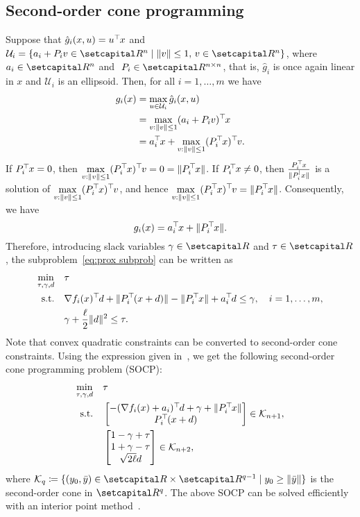 \documentclass[../../main]{subfiles}
\begin{document}
\subsection{Second-order cone programming} \label{sec:pgm:robust:SOCP}
Suppose that $\hat{g}_i (x,u) = u^\top\hspace{-1pt} x$ and ${\mathcal{U}}_i = \{ a_i + P_i v \in \setR^n \mid \| v \| \leq 1,\, v \in \setR^n \}$, where $a_i \in \setR^n$ and $\ P_i \in \setR^{n \times n}$, that is, $\hat{g}_i$ is once again linear in $x$ and $\mathcal{U}_i$ is an ellipsoid. Then, for all $i = 1,\dots,m$ we have
\begin{align}
g_i (x) &=  \max_{u \in {\mathcal{U}}_i } \hat{g}_i (x,u) \\
&=\max_{v : \| v \| \leq 1} (a_i + P_i v)^\top\hspace{-1pt} x \\
&= a_i^\top\hspace{-1pt} x + \max_{v : \| v \| \leq 1} (P_i^\top\hspace{-1pt} x)^\top\hspace{-1pt} v.
\end{align}
If $P_i^\top\hspace{-1pt} x = 0$, then $\displaystyle \max_{v : \| v \| \leq 1} (P_i^\top\hspace{-1pt} x)^\top\hspace{-1pt} v = 0 = \| P_i^\top\hspace{-1pt} x \|$. If $P_i^\top\hspace{-1pt} x \neq 0$, then $\frac{P_i^\top\hspace{-1pt} x}{\|P_i^| x\|}$ is a solution of $\displaystyle \max_{v : \| v \| \leq 1} (P_i^\top\hspace{-1pt} x)^\top\hspace{-1pt} v$, and hence $\displaystyle \max_{v : \| v \| \leq 1} (P_i^\top\hspace{-1pt} x)^\top\hspace{-1pt} v = \| P_i^\top\hspace{-1pt} x \|$. Consequently, we have
\[
	g_i(x) = a_i^\top\hspace{-1pt} x + \| P_i^\top\hspace{-1pt} x \|.
\]
Therefore, introducing slack variables $\gamma \in \setR$ and $\tau \in \setR$, the subproblem~\cref{eq:prox subprob} can be written as
\begin{align}
\begin{aligned}
\min_{\tau, \gamma, d} \quad   &\tau \\ 
\mathrm{s.t.}    \quad   &\nabla f_i (x)^\top\hspace{-1pt} d + \| P_i^\top\hspace{-1pt} (x + d) \| - \|P_i^\top\hspace{-1pt} x\| + a_i^\top\hspace{-1pt} d \leq \gamma, \quad i = 1,\ldots,m, \\
& \gamma + \frac{\ell}{2} \| d \|^2 \leq \tau.
\end{aligned}
\end{align}
Note that convex quadratic constraints can be converted to second-order cone constraints. Using the expression given in~\cite[Section 2.1]{Alizadeh2003}, we get the following second-order cone programming problem (SOCP):
\begin{align}\label{eq:socp}
\begin{aligned}
\min_{\tau, \gamma, d} \quad   &\tau \\ 
\mathrm{s.t.}    \quad   &\begin{bmatrix} -(\nabla f_i(x) + a_i)^\top\hspace{-1pt} d + \gamma + \|P_i^\top\hspace{-1pt} x\| \\
P_i^\top\hspace{-1pt} (x + d)
\end{bmatrix} \in \mathcal{K}_{n + 1}, \\
& \begin{bmatrix} 1 - \gamma + \tau \\
1 + \gamma - \tau \\
\sqrt{2 \ell} d
\end{bmatrix} \in \mathcal{K}_{n + 2},
\end{aligned}
\end{align}
where $\mathcal{K}_q \coloneqq \{(y_0, \bar{y}) \in \setR \times \setR^{q - 1} \mid y_0 \geq \| \bar{y} \|\}$ is the second-order cone in $\setR^{q}$.
The above SOCP can be solved efficiently with an interior point method~\cite{Alizadeh2003}.
\end{document}
